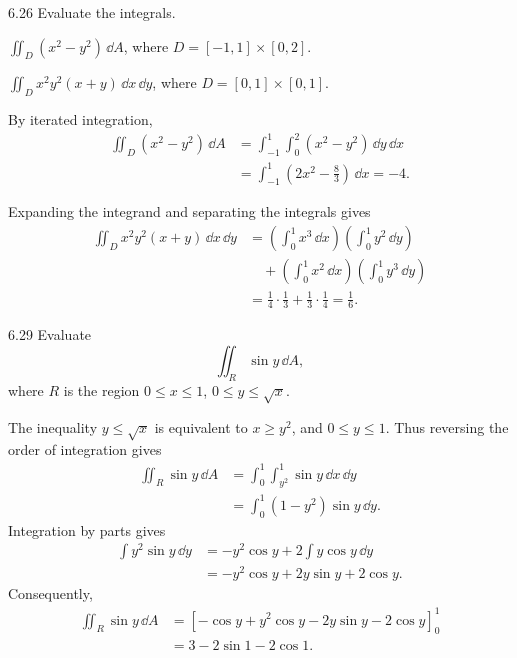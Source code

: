 \documentclass[11pt,oneside]{article}
\begin{document}
\begin{problem}{6.26}
Evaluate the integrals.
\begin{problemsubparts}
    \item $\displaystyle\iint_D(x^2-y^2)\,\dd A$,
          where $D=[-1, 1]\times[0, 2]$.
    \item $\displaystyle\iint_D x^2y^2(x+y)\,\dd x\,\dd y$,
          where $D=[0, 1]\times[0, 1]$.
\end{problemsubparts}
\end{problem}
\begin{solution}
\begin{problemsubparts}
    \item By iterated integration,
    \[
    \begin{aligned}
        \iint_D(x^2-y^2)\,\dd A
        &=\int_{-1}^1\int_0^2(x^2-y^2)\,\dd y\,\dd x\\
        &=\int_{-1}^1\left(2x^2-\frac83\right)\,\dd x
         =\boxed{-4}.
    \end{aligned}
    \]
    \item Expanding the integrand and separating the integrals gives
    \[
    \begin{aligned}
        \iint_D x^2y^2(x+y)\,\dd x\,\dd y
        &=\left(\int_0^1x^3\,\dd x\right)
          \left(\int_0^1y^2\,\dd y\right)\\
        &\quad+\left(\int_0^1x^2\,\dd x\right)
          \left(\int_0^1y^3\,\dd y\right)\\
        &=\frac14\cdot\frac13+\frac13\cdot\frac14
         =\boxed{\frac16}.
    \end{aligned}
    \]
\end{problemsubparts}
\end{solution}

\begin{problem}{6.29}
Evaluate
\[
    \iint_R\sin y\,\dd A,
\]
where $R$ is the region $0\le x\le1$, $0\le y\le\sqrt{x}$.
\end{problem}
\begin{solution}
The inequality $y\le\sqrt{x}$ is equivalent to $x\ge y^2$,
and $0\le y\le1$. Thus reversing the order of integration gives
\[
\begin{aligned}
    \iint_R\sin y\,\dd A
    &=\int_0^1\int_{y^2}^1\sin y\,\dd x\,\dd y\\
    &=\int_0^1(1-y^2)\sin y\,\dd y.
\end{aligned}
\]
Integration by parts gives
\[
\begin{aligned}
    \int y^2\sin y\,\dd y
    &=-y^2\cos y+2\int y\cos y\,\dd y\\
    &=-y^2\cos y+2y\sin y+2\cos y.
\end{aligned}
\]
Consequently,
\[
\begin{aligned}
    \iint_R\sin y\,\dd A
    &=\left[-\cos y+y^2\cos y
           -2y\sin y-2\cos y\right]_0^1\\
    &=\boxed{3-2\sin1-2\cos1}.
\end{aligned}
\]
\end{solution}
\end{document}
